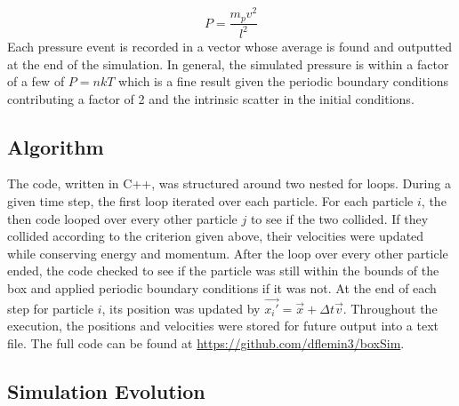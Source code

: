 \documentclass[12pt]{amsart}
\begin{document}
$$ P =  \frac{m_p v^2}{l^2}   $$
\newline
Each pressure event is recorded in a vector whose average is found and outputted at the end of the simulation.  In general, the simulated pressure is within a factor of a few of $P = nkT$ which is a fine result given the periodic boundary conditions contributing a factor of 2 and the intrinsic scatter in the initial conditions. 

\subsection{Algorithm}

The code, written in C++, was structured around two nested for loops.  During a given time step, the first loop iterated over each particle.  For each particle $i$, the then code looped over every other particle $j$ to see if the two collided.  If they collided according to the criterion given above, their velocities were updated while conserving energy and momentum.  After the loop over every other particle ended, the code checked to see if the particle was still within the bounds of the box and applied periodic boundary conditions if it was not.  At the end of each step for particle $i$, its position was updated by $\vec{x_i'} = \vec{x} + \Delta t \vec{v}$.  Throughout the execution, the positions and velocities were stored for future output into a text file.  The full code can be found at \href{https://github.com/dflemin3/boxSim}{https://github.com/dflemin3/boxSim}.

\subsection{Simulation Evolution}
\end{document}
